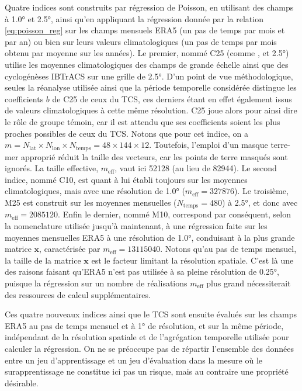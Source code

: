 \documentclass[../main.tex]{subfiles}
\begin{document}
Quatre indices sont construits par régression de Poisson, en utilisant des champs à \ang{1.0} et \ang{2.5}, ainsi qu'en appliquant la régression donnée par la
relation \ref{eq:poisson_reg} sur les champs mensuels ERA5 (un pas de temps par mois et par an) ou bien sur leurs valeurs climatologiques (un pas de temps par
mois obtenu par moyenne sur les années). Le premier, nommé C25 (comme , et \ang{2.5}) utilise les moyennes climatologiques des champs de
grande échelle ainsi que des cyclogénèses IBTrACS sur une grille de \ang{2.5}. D'un point de vue méthodologique, seules la réanalyse utilisée ainsi que la
période temporelle considérée distingue les coefficients $b$ de C25 de ceux du TCS, ces derniers étant en effet également issus de valeurs climatologiques à
cette même résolution. C25 joue alors pour ainsi dire le rôle de groupe témoin, car il est attendu que ses coefficients soient les plus proches possibles de
ceux du TCS. Notons que pour cet indice, on a $m = N_{\mathrm{lat}} \times N_{\mathrm{lon}} \times N_{\mathrm{temps}} = \num{48} \times \num{144} \times
\num{12}$. Toutefois, l'emploi d'un masque terre-mer approprié réduit la taille des vecteurs, car les points de terre masqués sont ignorés. La taille effective,
$m_{\mathrm{eff}}$, vaut ici \num{52128} (au lieu de \num{82944}). Le second indice, nommé C10, est quant à lui établi toujours sur les moyennes
climatologiques, mais avec une résolution de \ang{1.0} ($m_{\mathrm{eff}} = \num{327876}$). Le troisième, M25 est construit sur les moyennes mensuelles
($N_{\mathrm{temps}} = \num{480}$) à \ang{2.5}, et donc avec $m_{\mathrm{eff}} = \num{2085120}$. Enfin le dernier, nommé M10, correspond par conséquent, selon
la nomenclature utilisée jusqu'à maintenant, à une régression faite sur les moyennes mensuelles ERA5 à une résolution de \ang{1.0}, conduisant à la plus grande
matrice $\mathbf{x}$, caractérisée par $m_{\mathrm{eff}} = \num{13115040}$. Notons qu'au pas de temps mensuel, la taille de la matrice $\mathbf{x}$ est le
facteur limitant la résolution spatiale. C'est là une des raisons faisant qu'ERA5 n'est pas utilisée à sa pleine résolution de \ang{0.25}, puisque la régression
sur un nombre de réalisations $m_{\mathrm{eff}}$ plus grand nécessiterait des ressources de calcul supplémentaires.

Ces quatre nouveaux indices ainsi que le TCS sont ensuite évalués sur les champs ERA5 au pas de temps mensuel et à \ang{1} de résolution, et sur la même période,
indépendant de la résolution spatiale et de l'agrégation temporelle utilisée pour calculer la régression. On ne se préoccupe pas de répartir l'ensemble des
données entre un jeu d'apprentissage et un jeu d'évaluation dans la mesure où le surapprentissage ne constitue ici pas un risque, mais au contraire une
propriété désirable.
\end{document}
